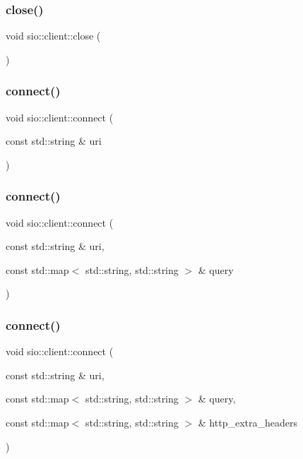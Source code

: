 \subsubsection{\texorpdfstring{close()}{close()}}
{\footnotesize\ttfamily void sio\+::client\+::close (\begin{DoxyParamCaption}{ }\end{DoxyParamCaption})}

\mbox{\label{classsio_1_1client_a0e2cf12e2ededbc00ae1de22768c22ac}} 
\subsubsection{\texorpdfstring{connect()}{connect()}\hspace{0.1cm}{\footnotesize\ttfamily [1/3]}}
{\footnotesize\ttfamily void sio\+::client\+::connect (\begin{DoxyParamCaption}\item[{const std\+::string \&}]{uri }\end{DoxyParamCaption})}

\mbox{\label{classsio_1_1client_a3867f1379415ed97bd47a3d53458c273}} 
\subsubsection{\texorpdfstring{connect()}{connect()}\hspace{0.1cm}{\footnotesize\ttfamily [2/3]}}
{\footnotesize\ttfamily void sio\+::client\+::connect (\begin{DoxyParamCaption}\item[{const std\+::string \&}]{uri,  }\item[{const std\+::map$<$ std\+::string, std\+::string $>$ \&}]{query }\end{DoxyParamCaption})}

\mbox{\label{classsio_1_1client_a9390bffe820269a81493f606e949b2b9}} 
\subsubsection{\texorpdfstring{connect()}{connect()}\hspace{0.1cm}{\footnotesize\ttfamily [3/3]}}
{\footnotesize\ttfamily void sio\+::client\+::connect (\begin{DoxyParamCaption}\item[{const std\+::string \&}]{uri,  }\item[{const std\+::map$<$ std\+::string, std\+::string $>$ \&}]{query,  }\item[{const std\+::map$<$ std\+::string, std\+::string $>$ \&}]{http\+\_\+extra\+\_\+headers }\end{DoxyParamCaption})}

